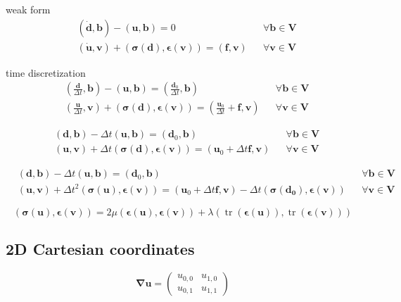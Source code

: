 \documentclass{scrartcl}
\newcommand{\vect}[1]{\boldsymbol{#1}}
\newcommand{\ten}[1]{\boldsymbol{#1}}
\DeclareMathOperator{\trace}{tr}
\begin{document}
weak form
\begin{align*}
&(\dot{\vect{d}},\vect{b}) - (\vect{u},\vect{b}) = 0 & &\forall \vect{b} \in \vect{V} \\
&(\dot{\vect{u}},\vect{v}) + (\ten{\sigma}(\vect{d}),\ten{\epsilon}(\vect{v})) =
(\vect{f},\vect{v}) & &\forall \vect{v} \in \vect{V}
\end{align*}

time discretization
\begin{align*}
&\left(\frac{\vect{d}}{\Delta t},\vect{b}\right) - (\vect{u},\vect{b}) =
\left(\frac{\vect{d}_0}{\Delta t},\vect{b} \right) & &\forall \vect{b} \in \vect{V} \\
&\left(\frac{\vect{u}}{\Delta t},\vect{v}\right) + (\ten{\sigma}(\vect{d}),\ten{\epsilon}(\vect{v})) =
\left(\frac{\vect{u}_0}{\Delta t} + \vect{f},\vect{v}\right) & &\forall \vect{v} \in \vect{V}
\end{align*}

\begin{align*}
&(\vect{d},\vect{b}) - \Delta t (\vect{u},\vect{b}) =
(\vect{d}_0,\vect{b}) & &\forall \vect{b} \in \vect{V} \\
&(\vect{u},\vect{v}) + \Delta t(\ten{\sigma}(\vect{d}),\ten{\epsilon}(\vect{v})) =
(\vect{u}_0 + \Delta t\vect{f},\vect{v}) & &\forall \vect{v} \in \vect{V}
\end{align*}

\begin{align*}
&(\vect{d},\vect{b}) - \Delta t (\vect{u},\vect{b}) =
(\vect{d}_0,\vect{b}) & &\forall \vect{b} \in \vect{V} \\
&(\vect{u},\vect{v}) + \Delta t^2 (\ten{\sigma}(\vect{u}),\ten{\epsilon}(\vect{v})) =
(\vect{u}_0 + \Delta t\vect{f},\vect{v}) - \Delta t (\ten{\sigma}(\vect{d_0}),\ten{\epsilon}(\vect{v}))
& &\forall \vect{v} \in \vect{V}
\end{align*}

\[
(\ten{\sigma}(\vect{u}),\ten{\epsilon}(\vect{v})) = 
2\mu (\ten{\epsilon}(\vect{u}),\ten{\epsilon}(\vect{v})) +
\lambda (\trace(\ten{\epsilon}(\vect{u})),\trace(\ten{\epsilon}(\vect{v})))
\]

\subsection{2D Cartesian coordinates}

\[
\ten{\nabla u} =
\begin{pmatrix}
u_{0,0} & u_{1,0} \\
u_{0,1} & u_{1,1}
\end{pmatrix}
\]
\end{document}
